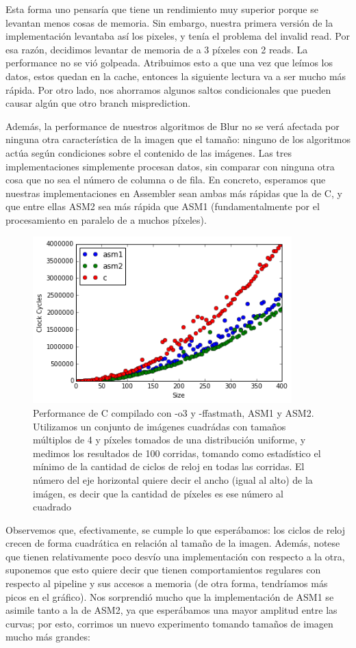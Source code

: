Esta forma uno pensaría que tiene un rendimiento muy superior porque se levantan menos cosas de memoria.
Sin embargo, nuestra primera versión de la implementación levantaba así los pixeles, y tenía el problema del invalid read. Por esa razón, decidimos levantar de memoria de a 3 píxeles con 2 reads. La performance no se vió golpeada. Atribuimos esto a que una vez que leímos los datos, estos quedan en la cache, entonces la siguiente lectura va a ser mucho más rápida. Por otro lado, nos ahorramos algunos saltos condicionales que pueden causar algún que otro branch misprediction.

Además, la performance de nuestros algoritmos de Blur no se verá afectada por ninguna otra característica de la imagen que el tamaño: ninguno de los algoritmos actúa según condiciones sobre el contenido de las imágenes. Las tres implementaciones simplemente procesan datos, sin comparar con ninguna otra cosa que no sea el número de columna o de fila. En concreto, esperamos que nuestras implementaciones en Assembler sean ambas más rápidas que la de C, y que entre ellas ASM2 sea más rápida que ASM1 (fundamentalmente por el procesamiento en paralelo de a muchos píxeles).

\begin{figure}[H]
	\centering
  \includegraphics[width=10cm]{images/blur-imagenes-chicas.png}
  \caption{Performance de C compilado con -o3 y -ffastmath, ASM1 y ASM2. Utilizamos un conjunto de imágenes cuadrádas con tamaños múltiplos de 4 y píxeles tomados de una distribución uniforme, y medimos los resultados de 100 corridas, tomando como estadístico el mínimo de la cantidad de ciclos de reloj en todas las corridas. El número del eje horizontal quiere decir el ancho (igual al alto) de la imágen, es decir que la cantidad de píxeles es ese número al cuadrado}
\end{figure}

Observemos que, efectivamente, se cumple lo que esperábamos: los ciclos de reloj crecen de forma cuadrática en relación al tamaño de la imagen. Además, notese que tienen relativamente poco desvío una implementación con respecto a la otra, suponemos que esto quiere decir que tienen comportamientos regulares con respecto al pipeline y sus accesos a memoria (de otra forma, tendríamos más picos en el gráfico). Nos sorprendió mucho que la implementación de ASM1 se asimile tanto a la de ASM2, ya que esperábamos una mayor amplitud entre las curvas; por esto, corrimos un nuevo experimento tomando tamaños de imagen mucho más grandes:

